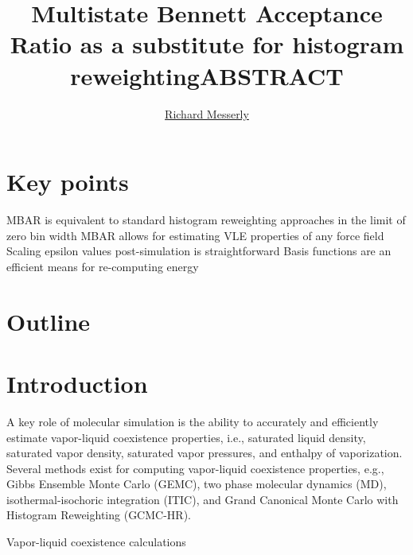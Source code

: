 \documentclass[11pt,a4paper]{article}
\begin{document}
	\thispagestyle{empty}
	\title{\Large \textbf{Multistate Bennett Acceptance Ratio as a substitute for histogram reweighting}}
	\author[1]{\large {\underline{Richard Messerly}}}%
	
	
	\date{} %
	\maketitle\thispagestyle{empty} %
	\begin{center}
		\title{\textbf{ABSTRACT}}\centering{}
	\end{center}
	\justify
	
\section*{Key points}

MBAR is equivalent to standard histogram reweighting approaches in the limit of zero bin width
MBAR allows for estimating VLE properties of any force field
Scaling epsilon values post-simulation is straightforward
Basis functions are an efficient means for re-computing energy

\section*{Outline}

\section{Introduction}



A key role of molecular simulation is the ability to accurately and efficiently estimate vapor-liquid coexistence properties, i.e., saturated liquid density, saturated vapor density, saturated vapor pressures, and enthalpy of vaporization. Several methods exist for computing vapor-liquid coexistence properties, e.g., Gibbs Ensemble Monte Carlo (GEMC), two phase molecular dynamics (MD), isothermal-isochoric integration (ITIC), and Grand Canonical Monte Carlo with Histogram Reweighting (GCMC-HR).  

Vapor-liquid coexistence calculations 
\end{document}
